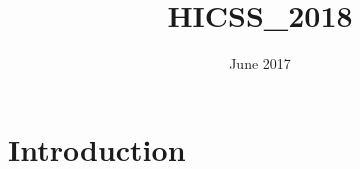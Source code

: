 \documentclass{article}
\title{HICSS_2018}
\author{ }
\date{June 2017}
\begin{document}
\maketitle

\section{Introduction}
\end{document}
